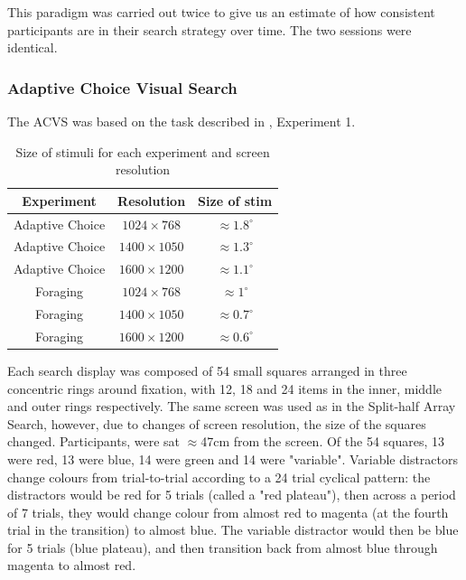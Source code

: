 \documentclass[]{rsos}%
\begin{document}
This paradigm was carried out twice to give us an estimate of how consistent participants are in their search strategy over time. The two sessions were identical.

\subsubsection{Adaptive Choice Visual Search}

The ACVS was based on the task described in \cite{irons-leber2018}, Experiment 1.

\begin{table}
	\centering
	\small
	\begin{tabular}{cc|c}
	    Experiment	    &	Resolution	     & Size of stim \\
		\hline
		Adaptive Choice & $1024 \times 768$  & $\approx$$1.8^{\circ}$ \\
		Adaptive Choice & $1400 \times 1050$ & $\approx$$1.3^{\circ}$ \\
		Adaptive Choice & $1600 \times 1200$ & $\approx$$1.1^{\circ}$ \\
		Foraging        & $1024 \times 768$  & $\approx$$1^{\circ}$ \\
		Foraging        & $1400 \times 1050$ & $\approx$$0.7^{\circ}$ \\
		Foraging        & $1600 \times 1200$ & $\approx$$0.6^{\circ}$ \\
	\end{tabular}
	\caption{Size of stimuli for each experiment and screen resolution}
	\label{tab:Screen_Res}
\end{table}

Each search display was composed of 54 small squares arranged in three concentric rings around fixation, with 12, 18 and 24 items in the inner, middle and outer rings respectively. The same screen was used as in the Split-half Array Search, however, due to changes of screen resolution, the size of the squares changed. Participants, were sat $\approx$47cm from the screen. Of the 54 squares, 13 were red, 13 were blue, 14 were green and 14 were "variable". Variable distractors change colours from trial-to-trial according to a 24 trial cyclical pattern: the distractors would be red for 5 trials (called a "red plateau"), then across a period of 7 trials, they would change colour from almost red to magenta (at the fourth trial in the transition) to almost blue. The variable distractor would then be blue for 5 trials (blue plateau), and then transition back from almost blue through magenta to almost red. 
\end{document}

